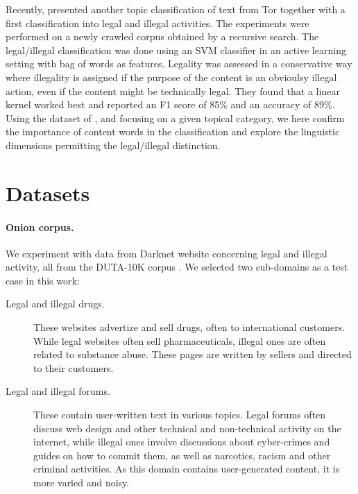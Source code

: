\documentclass[11pt,a4paper,table]{article}
\begin{document}
Recently, \citet{Avarikioti18} presented another topic classification of text from Tor together with a first classification into legal and illegal activities.  The experiments were performed on a newly crawled corpus obtained by a recursive search. The legal/illegal classification was done using an SVM classifier in an active learning setting with bag of words as features. Legality was assessed in a conservative way where illegality is assigned if the purpose of the content is an obvioulsy illegal action, even if the content might be technically legal. They found that a linear kernel worked best and reported an F1 score of 85\% and an accuracy of 89\%. Using the dataset of \citet{AlNabki19}, and focusing on a given topical category, we here confirm the importance of content words in the classification and explore the linguistic dimensions permitting the legal/illegal distinction. 




\section{Datasets}\label{sec:data}\label{datasets}

\paragraph{Onion corpus.}
We experiment with data from Darknet website concerning
legal and illegal activity, all from the DUTA-10K corpus \citep{AlNabki19}.
We selected two sub-domains as a test case in this work:
\begin{description}
  \item[Legal and illegal drugs.] These websites advertize and sell
  drugs, often to international customers.
  While legal websites often sell pharmaceuticals,
  illegal ones are often related to substance abuse.
  These pages are written by sellers and directed to their customers.
  \item[Legal and illegal forums.] These contain user-written text in various
  topics. Legal forums often discuss web design and other technical
  and non-technical activity on the internet, while illegal ones involve
  discussions about cyber-crimes and guides on how to commit them,
  as well as narcotics, racism and other criminal activities.
  As this domain contains user-generated content, it is more varied
  and noisy.
\end{description}
\end{document}
